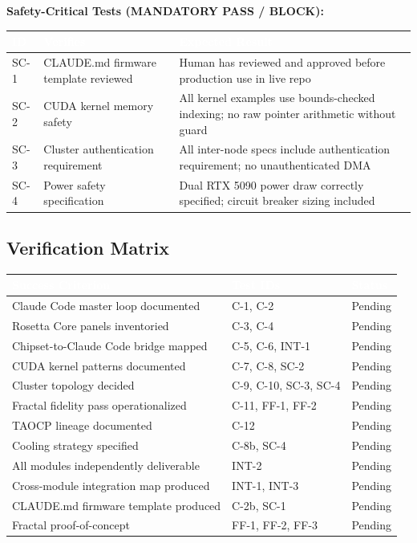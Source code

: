 \documentclass[11pt,letterpaper]{article}
\newcommand{\tableheader}[1]{\textbf{\sffamily\textcolor{white}{#1}}}
\begin{document}
\textbf{Safety-Critical Tests (MANDATORY PASS / BLOCK):}

\begin{center}
\begin{tabularx}{\textwidth}{L{1.5cm}L{4cm}X}
\toprule
{}
\tableheader{ID} & \tableheader{Verifies} & \tableheader{Expected Result} \\
\midrule
SC-1 & CLAUDE.md firmware template reviewed & Human has reviewed and approved before production use in live repo \\
SC-2 & CUDA kernel memory safety & All kernel examples use bounds-checked indexing; no raw pointer arithmetic without guard \\
SC-3 & Cluster authentication requirement & All inter-node specs include authentication requirement; no unauthenticated DMA \\
SC-4 & Power safety specification & Dual RTX 5090 power draw correctly specified; circuit breaker sizing included \\
\bottomrule
\end{tabularx}
\end{center}

\subsection{Verification Matrix}

\begin{center}
\begin{tabularx}{\textwidth}{L{5cm}L{3cm}L{2.5cm}}
\toprule
{}
\tableheader{Success Criterion} & \tableheader{Test IDs} & \tableheader{Status} \\
\midrule
Claude Code master loop documented & C-1, C-2 & Pending \\
Rosetta Core panels inventoried & C-3, C-4 & Pending \\
Chipset-to-Claude Code bridge mapped & C-5, C-6, INT-1 & Pending \\
CUDA kernel patterns documented & C-7, C-8, SC-2 & Pending \\
Cluster topology decided & C-9, C-10, SC-3, SC-4 & Pending \\
Fractal fidelity pass operationalized & C-11, FF-1, FF-2 & Pending \\
TAOCP lineage documented & C-12 & Pending \\
Cooling strategy specified & C-8b, SC-4 & Pending \\
All modules independently deliverable & INT-2 & Pending \\
Cross-module integration map produced & INT-1, INT-3 & Pending \\
CLAUDE.md firmware template produced & C-2b, SC-1 & Pending \\
Fractal proof-of-concept & FF-1, FF-2, FF-3 & Pending \\
\bottomrule
\end{tabularx}
\end{center}
\end{document}
